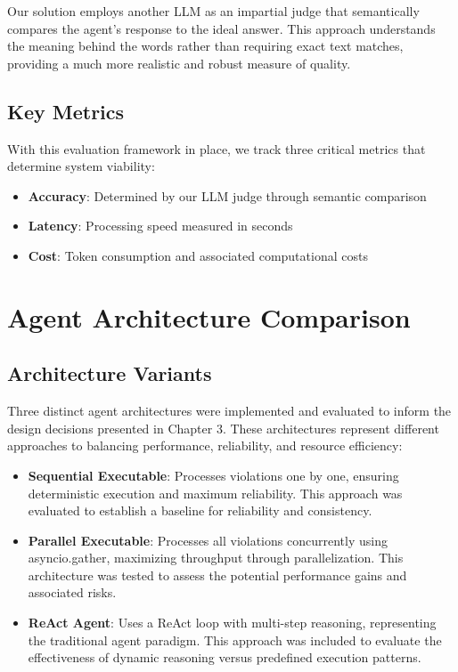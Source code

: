 \begin{spacing}{1.2}
Our solution employs another LLM as an impartial judge that semantically compares the agent's response to the ideal answer. This approach understands the meaning behind the words rather than requiring exact text matches, providing a much more realistic and robust measure of quality.

\subsection{Key Metrics}
With this evaluation framework in place, we track three critical metrics that determine system viability:

\begin{itemize}
    \item \textbf{Accuracy}: Determined by our LLM judge through semantic comparison
    \item \textbf{Latency}: Processing speed measured in seconds
    \item \textbf{Cost}: Token consumption and associated computational costs
\end{itemize}

\section{Agent Architecture Comparison}

\subsection{Architecture Variants}
Three distinct agent architectures were implemented and evaluated to inform the design decisions presented in Chapter 3. These architectures represent different approaches to balancing performance, reliability, and resource efficiency:

\begin{itemize}
    \item \textbf{Sequential Executable}: Processes violations one by one, ensuring deterministic execution and maximum reliability. This approach was evaluated to establish a baseline for reliability and consistency.
    \item \textbf{Parallel Executable}: Processes all violations concurrently using asyncio.gather, maximizing throughput through parallelization. This architecture was tested to assess the potential performance gains and associated risks.
    \item \textbf{ReAct Agent}: Uses a ReAct loop with multi-step reasoning, representing the traditional agent paradigm. This approach was included to evaluate the effectiveness of dynamic reasoning versus predefined execution patterns.
\end{itemize}


\end{spacing}
